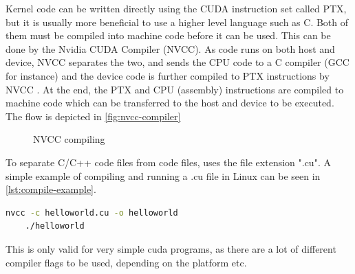 Kernel code can be written directly using the CUDA instruction set called PTX, but it is usually more beneficial to use a higher level language such as C.
Both of them must be compiled into machine code before it can be used.
This can be done by the Nvidia CUDA Compiler (NVCC).
As \cuda{} code runs on both host and device, NVCC separates the two, and sends the CPU code to a C compiler (GCC for instance) and the device code is further compiled to PTX instructions by NVCC \cite{cuda:programmingguide}.
At the end, the PTX and CPU (assembly) instructions are compiled to machine code which can be transferred to the host and device to be executed.
The flow is depicted in \autoref{fig:nvcc-compiler}
\begin{figure}[ht]
	\centering
	\caption{NVCC compiling}
	\label{fig:nvcc-compiler}
\end{figure}
To separate C/C++ code files from \cuda{} code files, \cuda{} uses the file extension ".cu".
A simple example of compiling and running a .cu file in Linux can be seen in \autoref{lst:compile-example}.
\begin{lstlisting}[language=bash,caption={Compilation and run example},label=lst:compile-example]
	nvcc -c helloworld.cu -o helloworld
	./helloworld 
\end{lstlisting}
This is only valid for very simple cuda programs, as there are a lot of different compiler flags to be used, depending on the platform etc.